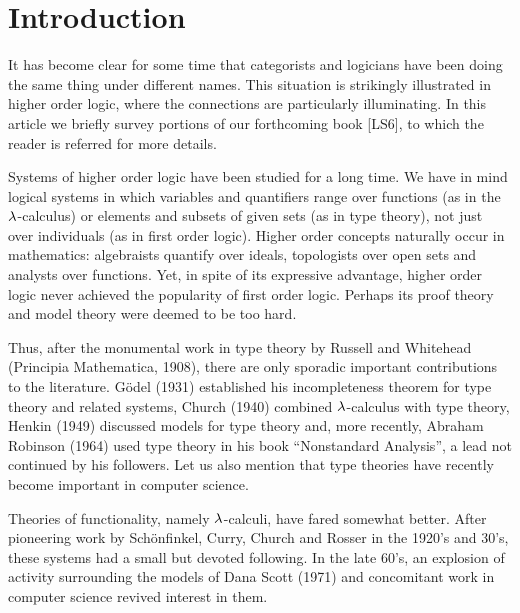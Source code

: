 \setcounter{section}{-1}


\maketitle

\section{Introduction}

It has become clear for some time that categorists and logicians have been
doing the same thing under different names. This situation is strikingly
illustrated in higher order logic, where the connections are particularly
illuminating. In this article we briefly survey portions of our forthcoming
book [LS6], to which the reader is referred for more details.

Systems of higher order logic have been studied for a long time. We have
in mind logical systems in which variables and quantifiers range over functions
(as in the $\lambda$-calculus) or elements and subsets of given sets (as in type
theory), not just over individuals (as in first order logic). Higher order
concepts naturally occur in mathematics: algebraists quantify over ideals,
topologists over open sets and analysts over functions. Yet, in spite of its
expressive advantage, higher order logic never achieved the popularity of first
order logic. Perhaps its proof theory and model theory were deemed to be too
hard.

Thus, after the monumental work in type theory by Russell and Whitehead
(Principia Mathematica, 1908), there are only sporadic important contributions
to the literature. G\"{o}del (1931) established his incompleteness theorem for
type theory and related systems, Church (1940) combined $\lambda$-calculus with type
theory, Henkin (1949) discussed models for type theory and, more recently,
Abraham Robinson (1964) used type theory in his book ``Nonstandard Analysis'',
a lead not continued by his followers. Let us also mention that type theories
have recently become important in computer science.

Theories of functionality, namely $\lambda$-calculi, have fared somewhat better.
After pioneering work by Sch\"onfinkel, Curry, Church and Rosser in the 1920's
and 30's, these systems had a small but devoted following. In the late 60's,
an explosion of activity surrounding the models of Dana Scott (1971) and concomitant
work in computer science revived interest in them.

